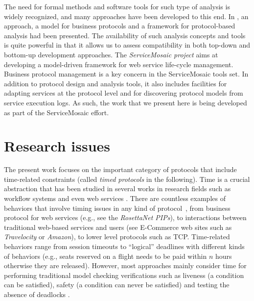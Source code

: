 The need for formal methods and software tools for such type of analysis is widely recognized, and many approaches have been developed to this end. In \cite{BBFC04,BBFC04b,FTBB}, an approach, a model for business protocols and a framework for protocol-based analysis had been presented. The availability of such analysis concepts and tools is quite powerful in that it allows us to assess compatibility in both top-down and bottom-up development approaches. 
%
The \emph{ServiceMosaic project} \cite{BCTPM06-SM} aims at developing a model-driven framework for web service life-cycle management. Business protocol management is a key concern in the ServiceMosaic tools set. In addition to protocol design and analysis tools, it also includes facilities for adapting services at the protocol level and for discovering protocol models from service execution logs. As such, the work that we present here is being developed as part of the ServiceMosaic effort.


\section{Research issues}


The present work focuses on the important category of protocols that include time-related constraints (called \emph{timed protocols} in the following).
Time is a crucial abstraction that has been studied in several works in research fields such as workflow systems \cite{LTIM06,DMMZ06,BWJ02} and even web services \cite{berardi03finite,KazhamiakinPP06,DCPVC06}. There are countless examples of  behaviors that involve timing issues in any kind of protocol~\cite{BBFC04}, from business protocol for web services (e.g., see the \emph{RosettaNet PIPs}), to interactions between traditional web-based services and users (see E-Commerce web sites such as \emph{Travelocity} or \emph{Amazon}), to lower level protocols such as TCP. Time-related behaviors range from session timeouts to ``logical'' deadlines with different kinds of behaviors (e.g., seats reserved on a flight needs to be paid within $n$ hours otherwise they are released). However, most approaches mainly consider time for performing traditional model checking verifications such as liveness (a condition can be satisfied), safety (a condition can never be satisfied) and testing the absence of deadlocks \cite{KazhamiakinPP06,DCPVC06,berardi03finite}.\\

